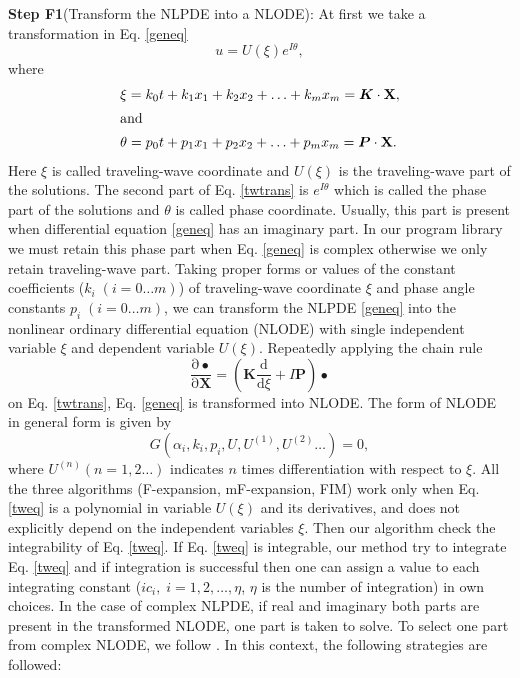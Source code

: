 \documentclass[prd,aps,floats,showkeys,nofootinbib,notitlepage]{revtex4}
\begin{document}
	\textbf{Step F1}(Transform the NLPDE into a NLODE): At first we take a transformation in Eq. \eqref{geneq}
	\begin{equation}\label{twtrans}
		u = U(\xi )e^{I\theta},
	\end{equation}
	where
	\begin{align}
		\label{twco}& \xi = k_0t + k_1{x_1} + {k_2}{x_2} +  \ldots  + {k_m}{x_m}=\boldsymbol{K}\cdot\mathbf{X},\nonumber\\
		\intertext{and}& \theta = {p_0}t + {p_1}{x_1} + {p_2}{x_2} +  \ldots  + {p_m}{x_m}=\boldsymbol{P}\cdot\mathbf{X}.
	\end{align}
	Here $\xi$ is called traveling-wave coordinate and $U(\xi )$ is the traveling-wave part  of the solutions. The second part of Eq. \eqref{twtrans} is $e^{I\theta}$ which is called the phase part of the solutions and $\theta$ is called phase coordinate. Usually, this part is present when differential equation \eqref{geneq} has an imaginary part. In our program library we must retain this phase part when Eq. \eqref{geneq} is complex otherwise we only retain traveling-wave part. Taking proper forms or values of the constant coefficients ($k_i\;(i=0\ldots m)$) of traveling-wave coordinate $\xi$ and phase angle constants $p_i\;(i=0\ldots m)$, we can transform the NLPDE \eqref{geneq}  into the nonlinear ordinary differential equation (NLODE) with single independent variable $\xi$ and dependent variable $U(\xi)$. Repeatedly applying the chain rule 
	\begin{equation}\label{twtrans2}
		\frac{\mathrm{\partial} \bullet }{\mathrm{\partial} \mathbf{X}}=\left ( \boldsymbol{K}\frac{\mathrm{d} }{\mathrm{d} \xi}+I\boldsymbol{P} \right )\bullet
	\end{equation}
	on Eq. \eqref{twtrans}, Eq. \eqref{geneq} is transformed into NLODE. The form of NLODE in general form is given by
	\begin{equation}\label{tweq}
		G\left( {\alpha_i,k_i,p_i,U,U^{(1)},U^{(2)}} \ldots \right) = 0,
	\end{equation}
	where $U^{(n)} (n=1,2\ldots)$ indicates $n$ times differentiation with respect to $\xi$. All the three algorithms (F-expansion, mF-expansion, FIM) work only when Eq. \eqref{tweq} is a polynomial in variable $U(\xi)$ and its derivatives, and does not explicitly depend on the independent variables $\xi$. Then our algorithm check the integrability of Eq. \eqref{tweq}. If Eq. \eqref{tweq} is integrable, our method try to integrate Eq. \eqref{tweq} and if integration is successful then one can assign a value to each integrating constant ($ic_i,\;i=1,2,\ldots,\eta$, $\eta$ is the number of integration) in own choices. In the case of complex NLPDE, if real and imaginary both parts are present in the transformed NLODE, one part is taken to solve. To select one part from complex NLODE, we follow \cite{complexTwt,complexTwt1}. In this context, the following strategies are followed:
\end{document}
